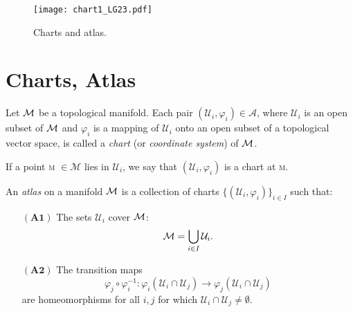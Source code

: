 
\begin{figure}[h]
\texttt{[image: chart1\_LG23.pdf]} 
\caption{Charts and atlas.}\label{F:chart1}
\end{figure}

\section{Charts, Atlas}

\begin{definition}[Chart]
Let $\mathcal{M}$ be a topological manifold. Each pair $(\mathcal{U}_i, \varphi_i) \in \mathcal{A}$, where $\mathcal{U}_i$ is an open subset of $\mathcal{M}$ and $\varphi_i$ is a mapping of $\mathcal{U}_i$ onto an open subset of a topological vector space, is called a \textit{chart} (or \textit{coordinate system}) of $\mathcal{M}$.

If a point \textsc{m} $\in \mathcal{M}$ lies in $\mathcal{U}_i$, we say that $(\mathcal{U}_i, \varphi_i)$ is a chart at \textsc{m}.
\end{definition}

\begin{definition}[Atlas]
An \textit{atlas} on a manifold $\mathcal{M}$ is a collection of charts $\{(\mathcal{U}_i, \varphi_i)\}_{i \in I}$ such that:
\begin{itemize}
    \item[$\mathbf{(A1)}$] The sets $\mathcal{U}_i$ cover $\mathcal{M}$:
    \[
    \mathcal{M} = \bigcup_{i \in I} \mathcal{U}_i.
    \]
    \item[$\mathbf{(A2)}$] The transition maps
    \[
    \varphi_j \circ \varphi_i^{-1}: \varphi_i(\mathcal{U}_i \cap \mathcal{U}_j) \to \varphi_j(\mathcal{U}_i \cap \mathcal{U}_j)
    \]
    are homeomorphisms for all $i, j$ for which $\mathcal{U}_i \cap \mathcal{U}_j \neq \emptyset$.
\end{itemize}
\end{definition}

